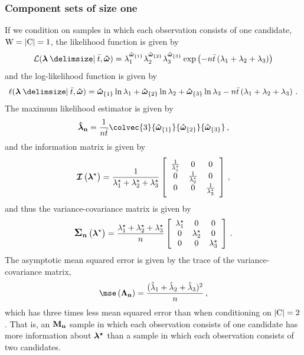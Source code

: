 \documentclass[
    11pt,
    extrafontsizes,
    article,
    oldfontcommands,
    final,
    oneside,
    openany,
    hidelinks]{memoir}
\begin{document}
\subsubsection{Component sets of size one}
If we condition on samples in which each observation consists of one candidate, $\mathrm{W} = \lvert\mathrm{C}\rvert = 1$, the likelihood function is given by
\begin{equation}
    \likelihood(\vec\lambda \Given \bar{t}, \cntsymb) = \lambda_1^{\cnt{1}} \lambda_2^{\cnt{2}} \lambda_3^{\cnt{3}} \exp\left(-n \bar{t} \left(\lambda_1 + \lambda_2 + \lambda_3\right)\right)
\end{equation}
and the log-likelihood function is given by
\begin{equation}
    \ell(\vec\lambda \Given \bar{t}, \cntsymb) = \cnt{1} \ln\lambda_1 + \cnt{2} \ln\lambda_2 + \cnt{3} \ln\lambda_3 - n \bar{t}\left(\lambda_1 + \lambda_2 + \lambda_3\right)\,.
\end{equation}
The maximum likelihood estimator is given by
\begin{equation}
    \expomle = \frac{1}{n \bar{t}} \colvec{3}
        {\cnt{1}}
        {\cnt{2}}
        {\cnt{3}}\,,
\end{equation}
and the information matrix is given by
\begin{equation}
\operatorname{\boldsymbol{\mathcal{I}}} \left ( {\boldsymbol{\mathbf{\lambda}}}^{\star} \right ) =
\frac{1}{{\lambda}^{\star}_1 + {\lambda}^{\star}_2 + {\lambda}^{\star}_3}
\left[
\begin{array}{ccc}
    \frac{1}{{\lambda}^{\star}_1} & 0                            & 0\\
    0                            & \frac{1}{{\lambda}^{\star}_2} & 0\\
    0                            & 0                            & \frac{1}{{\lambda}^{\star}_3}
\end{array}
\right]\,,
\end{equation}
and thus the variance-covariance matrix is given by
\begin{equation}
    \cov\left(\tparam{\vec\lambda}\right) = \frac{\tparam{\lambda}_1+\tparam{\lambda}_2+\tparam{\lambda}_3}{n}
    \left[
    \begin{array}{ccc}
        \tparam{\lambda}_1 & 0                  & 0\\
        0                  & \tparam{\lambda}_2 & 0\\
        0                  & 0                  & \tparam{\lambda}_3
    \end{array}
\right]\,.
\end{equation}
The asymptotic mean squared error is given by the trace of the variance-covariance matrix,
\begin{equation}
    \mse\left(\sampdexpo\right) = \frac{(\estimator{\lambda}_1 +  \estimator{\lambda}_2 +  \estimator{\lambda}_3)^2}{n}\,,
\end{equation}
which has three times less mean squared error than when conditioning on $\lvert\mathrm{C}\rvert = 2$. That is, an $\boldsymbol{\mathbf{M_n}}$ sample in which each observation consists of one candidate has more information about $\boldsymbol{\mathbf{{\lambda}^{\star}}}$ than a sample in which each observation consists of two candidates.
\end{document}
